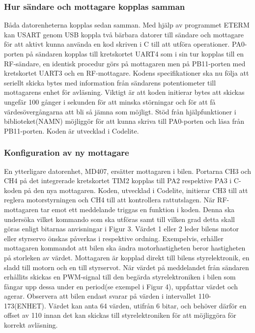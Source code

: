 \documentclass[a4paper]{article}
\begin{document}
\subsubsection{Hur sändare och mottagare kopplas samman}
\vspace{5mm} \noindent
Båda datorenheterna kopplas sedan samman. Med hjälp av programmet ETERM kan USART genom USB koppla två bärbara datorer till sändare och mottagare för att aktivt kunna använda en kod skriven i C till att utföra operationer. PA0-porten på sändaren kopplas till kretskortet UART4 som i sin tur kopplas till en RF-sändare, en identisk procedur görs på mottagaren men på PB11-porten med kretskortet UART3 och en RF-mottagare. Kodens specifikationer ska nu följa att seriellt skicka bytes med information från sändarens potentiometer till mottagarens enhet för avläsning. Viktigt är att koden initierar bytes att skickas ungefär 100 gånger i sekunden för att minska störningar och för att få värdesövergångarna att bli så jämna som möjligt. Stöd från hjälpfunktioner i biblioteket(NAMN) möjliggör för att kunna skriva till PA0-porten och läsa från PB11-porten. Koden är utvecklad i Codelite.


\subsubsection{Konfiguration av ny mottagare}
\vspace{5mm} \noindent
En ytterligare datorenhet, MD407, ersätter mottagaren i bilen. Portarna CH3 och CH4 på det integrerade kretskortet TIM2 kopplas till PA2 respektive PA3 i C-koden på den nya mottagaren. Koden, utvecklad i Codelite, initierar CH3 till att reglera motorstyrningen och CH4 till att kontrollera rattutslagen. När RF-mottagaren tar emot ett meddelande triggas en funktion i koden. Denna ska undersöka vilket kommando som ska utföras samt till vilken grad detta skall göras enligt bitarnas anvisningar i Figur 3. Värdet 1 eller 2 leder bilens motor eller styrservo önskas påverkas i respektive ordning. Exempelvis, erhåller mottagaren kommandot att bilen ska ändra motorhastigheten beror hastigheten på storleken av värdet. Mottagaren är kopplad direkt till bilens styrelektronik, en sladd till motorn och en till styrservot. När värdet på meddelandet från sändaren erhållits skickas en PWM-signal till den begärda styrelektroniken i bilen som fångar upp dessa under en period(se exempel i Figur 4), uppfattar värdet och agerar. Observera att bilen endast svarar på värden i intervallet 110-173(ENHET). Värdet kan anta 64 värden, utifrån 6 bitar, och behöver därför en offset av 110 innan det kan skickas till styrelektroniken för att möjliggöra för korrekt avläsning.
\end{document}
